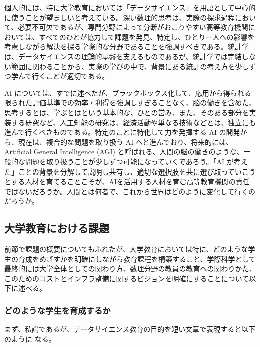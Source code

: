 \documentclass[
]{bxjsbook}
\theoremstyle{definition}
\theoremstyle{definition}
\theoremstyle{definition}
\theoremstyle{definition}
\theoremstyle{remark}
\begin{document}
個人的には、特に大学教育においては「データサイエンス」を用語として中心的に使うことが望ましいと考えている。深い数理的思考は、実際の探求過程において、必要不可欠であるが、専門分野によって分断がおこりやすい高等教育機関においては、すべてのひとが協力して課題を発見、特定し、ひとり一人への影響を考慮しながら解決を探る学際的な分野であることを強調すべきである。統計学は、データサイエンスの理論的基盤を支えるものであるが、統計学では完結しない範囲に関わることから、実際の学びの中で、背景にある統計の考え方を少しずつ学んで行くことが適切である。

AI については、すでに述べたが、ブラックボックス化して、応用から得られる限られた評価基準での効率・利得を強調しすぎることなく、脳の働きを含めた、思考するとは、学ぶとはという基本的な、ひとの営み、また、そのある部分を実装する研究など、人工知能の研究は、経済活動や単なる技術などとは、独立にも進んで行くべきものである。特定のことに特化して力を発揮する AI の開発から、現在は、複合的な問題を取り扱う AI へと進んでおり、将来的には、Artificial General Intelligence (AGI) と呼ばれる、人間の脳の働きのような、一般的な問題を取り扱うことが少しずつ可能になっていくであろう。「AI が考えた」ことの背景を分解して説明し共有し、適切な選択肢を共に選び取っていこうとする人材を育てることこそが、AIを活用する人材を育む高等教育機関の責任ではないだろうか。人間とは何者で、これから世界はどのように変化して行くのだろうか。

\hypertarget{ux5927ux5b66ux6559ux80b2ux306bux304aux3051ux308bux8ab2ux984c}{%
\subsection{大学教育における課題}\label{ux5927ux5b66ux6559ux80b2ux306bux304aux3051ux308bux8ab2ux984c}}

前節で課題の概要についてもふれたが、大学教育においては特に、どのような学生の育成をめざすかを明確にしながら教育課程を構築すること、学際科学として最終的には大学全体としての関わり方、数理分野の教員の教育への関わりかた、このためのコストとインフラ整備に関するビジョンを明確にすることについて以下に述べる。

\hypertarget{ux3069ux306eux3088ux3046ux306aux5b66ux751fux3092ux80b2ux6210ux3059ux308bux304b}{%
\subsubsection{どのような学生を育成するか}\label{ux3069ux306eux3088ux3046ux306aux5b66ux751fux3092ux80b2ux6210ux3059ux308bux304b}}

まず、私論であるが、データサイエンス教育の目的を短い文章で表現すると以下のように
なる。
\end{document}
